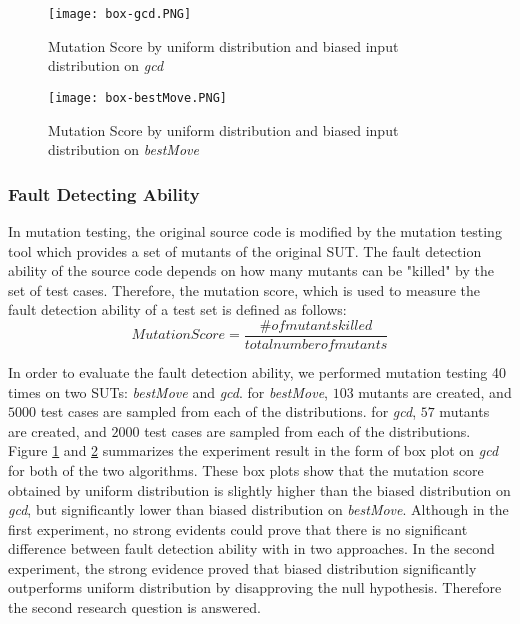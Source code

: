 \documentclass[journal]{IEEEtran}
\begin{document}
 \begin{figure}[t]
	\hspace*{0.2cm}
	\texttt{[image: box-gcd.PNG]}
	\caption{Mutation Score by uniform distribution and biased input distribution on \emph{gcd}}
	\label{fig:gcd}
\end{figure} 
\begin{figure}[t]
	\hspace*{0.2cm}
	\texttt{[image: box-bestMove.PNG]}
	\caption{Mutation Score by uniform distribution and biased input distribution on \emph{bestMove}}
	\label{fig:bestMove}
\end{figure} 

\subsubsection{Fault Detecting Ability} 
In mutation testing, the original source code is modified by the mutation testing tool which provides a set of mutants of the original SUT. The fault detection ability of the source code depends on how many mutants can be "killed" by the set of test cases. Therefore, the mutation score, which is used to measure the fault detection ability of a test set is defined as follows:
\[Mutation Score = \frac{\#of mutants killed}{total number of mutants}\]

In order to evaluate the fault detection ability, we performed mutation testing 40 times on two SUTs: \emph{bestMove} and \emph{gcd}. for \emph{bestMove}, \(103\) mutants are created, and \(5000\) test cases are sampled from each of the distributions. for \emph{gcd}, \(57\) mutants are created, and \(2000\) test cases are sampled from each of the distributions.
Figure \ref{fig:gcd} and \ref{fig:bestMove} summarizes the experiment result in the form of box plot on \emph{gcd} for both of the two algorithms. These box plots show that the mutation score obtained by uniform distribution is slightly higher than the biased distribution on \emph{gcd}, but significantly lower than biased distribution on \emph{bestMove}. Although in the first experiment, no strong evidents could prove that there is no significant difference between fault detection ability with in two approaches. In the second experiment, the strong evidence proved that biased distribution significantly outperforms uniform distribution by disapproving the null hypothesis. Therefore the second research question is answered. 


 

%
\IEEEpeerreviewmaketitle
\end{document}
